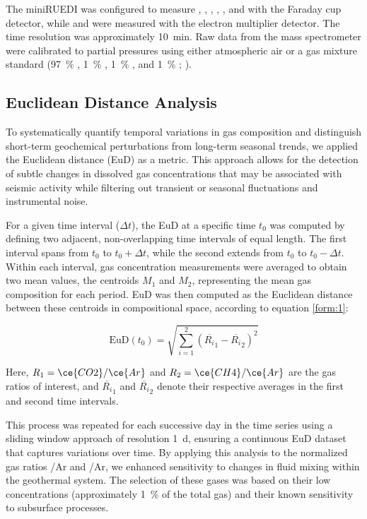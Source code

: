 The miniRUEDI was configured to measure , , , , , and  with the Faraday cup detector, while  and  were measured with the electron multiplier detector.
The time resolution was approximately \SI{10}{\minute}.
Raw data from the mass spectrometer were calibrated to partial pressures using either atmospheric air \citep{porcelli2002overview} or a gas mixture standard (\SI{97}{\percent} , \SI{1}{\percent} , \SI{1}{\percent} , and \SI{1}{\percent} ; \cite{tomonaga2019montterri}).


\subsection{Euclidean Distance Analysis}\label{methods:EuD}
To systematically quantify temporal variations in gas composition and distinguish short-term geochemical perturbations from long-term seasonal trends, we applied the Euclidean distance (EuD) as a metric.
This approach allows for the detection of subtle changes in dissolved gas concentrations that may be associated with seismic activity while filtering out transient or seasonal fluctuations and instrumental noise.  

For a given time interval (\(\Delta t\)), the EuD at a specific time \(t_0\) was computed by defining two adjacent, non-overlapping time intervals of equal length.
The first interval spans from \(t_0\) to \(t_0 + \Delta t\), while the second extends from \(t_0\) to \(t_0 - \Delta t\).
Within each interval, gas concentration measurements were averaged to obtain two mean values, the centroids \(M_1\) and \(M_2\), representing the mean gas composition for each period.
EuD was then computed as the Euclidean distance between these centroids in compositional space, according to equation \ref{form:1}:

\begin{equation}
    \label{form:1}
    \text{EuD}(t_0) = \sqrt{ \sum_{i=1}^{2} \left( \overline{R_i}_1 - \overline{R_i}_2 \right)^2 }
\end{equation}

Here, \(R_1 = \ce{CO2}/\ce{Ar}\) and \(R_2 = \ce{CH4}/\ce{Ar}\) are the gas ratios of interest, and \(\overline{R_i}_1\) and \(\overline{R_i}_2\) denote their respective averages in the first and second time intervals.

This process was repeated for each successive day in the time series using a sliding window approach of resolution \SI{1}{\day}, ensuring a continuous EuD dataset that captures variations over time.
By applying this analysis to the normalized gas ratios /Ar and /Ar, we enhanced sensitivity to changes in fluid mixing within the geothermal system.
The selection of these gases was based on their low concentrations (approximately \SI{1}{\percent} of the total gas) and their known sensitivity to subsurface processes.


